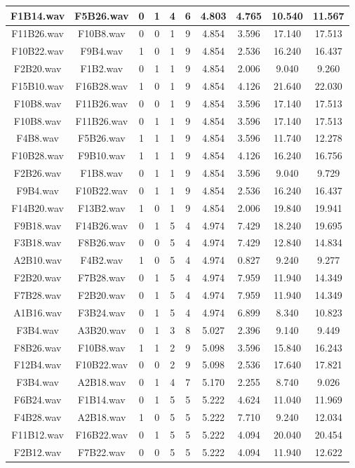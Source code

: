 \documentclass[11pt,a4paper,twoside]{book}
\begin{document}
\begin{longtable}[c]{|c|c|c|c|c|c|c|c|c|c|}
F1B14.wav&F5B26.wav&0&1&4&6&4.803&4.765&10.540&11.567\\ \hline
F11B26.wav&F10B8.wav&0&0&1&9&4.854&3.596&17.140&17.513\\ \hline
F10B22.wav&F9B4.wav&1&0&1&9&4.854&2.536&16.240&16.437\\ \hline
F2B20.wav&F1B2.wav&0&1&1&9&4.854&2.006&9.040&9.260\\ \hline
F15B10.wav&F16B28.wav&1&0&1&9&4.854&4.126&21.640&22.030\\ \hline
F10B8.wav&F11B26.wav&0&0&1&9&4.854&3.596&17.140&17.513\\ \hline
F10B8.wav&F11B26.wav&0&1&1&9&4.854&3.596&17.140&17.513\\ \hline
F4B8.wav&F5B26.wav&1&1&1&9&4.854&3.596&11.740&12.278\\ \hline
F10B28.wav&F9B10.wav&1&1&1&9&4.854&4.126&16.240&16.756\\ \hline
F2B26.wav&F1B8.wav&0&1&1&9&4.854&3.596&9.040&9.729\\ \hline
F9B4.wav&F10B22.wav&0&1&1&9&4.854&2.536&16.240&16.437\\ \hline
F14B20.wav&F13B2.wav&1&0&1&9&4.854&2.006&19.840&19.941\\ \hline
F9B18.wav&F14B26.wav&0&1&5&4&4.974&7.429&18.240&19.695\\ \hline
F3B18.wav&F8B26.wav&0&0&5&4&4.974&7.429&12.840&14.834\\ \hline
A2B10.wav&F4B2.wav&1&0&5&4&4.974&0.827&9.240&9.277\\ \hline
F2B20.wav&F7B28.wav&0&1&5&4&4.974&7.959&11.940&14.349\\ \hline
F7B28.wav&F2B20.wav&0&1&5&4&4.974&7.959&11.940&14.349\\ \hline
A1B16.wav&F3B24.wav&0&1&5&4&4.974&6.899&8.340&10.823\\ \hline
F3B4.wav&A3B20.wav&0&1&3&8&5.027&2.396&9.140&9.449\\ \hline
F8B26.wav&F10B8.wav&1&1&2&9&5.098&3.596&15.840&16.243\\ \hline
F12B4.wav&F10B22.wav&0&0&2&9&5.098&2.536&17.640&17.821\\ \hline
F3B4.wav&A2B18.wav&0&1&4&7&5.170&2.255&8.740&9.026\\ \hline
F6B24.wav&F1B14.wav&0&1&5&5&5.222&4.624&11.040&11.969\\ \hline
F4B28.wav&A2B18.wav&1&0&5&5&5.222&7.710&9.240&12.034\\ \hline
F11B12.wav&F16B22.wav&0&1&5&5&5.222&4.094&20.040&20.454\\ \hline
F2B12.wav&F7B22.wav&0&0&5&5&5.222&4.094&11.940&12.622\\ \hline

\end{longtable}
\end{document}
